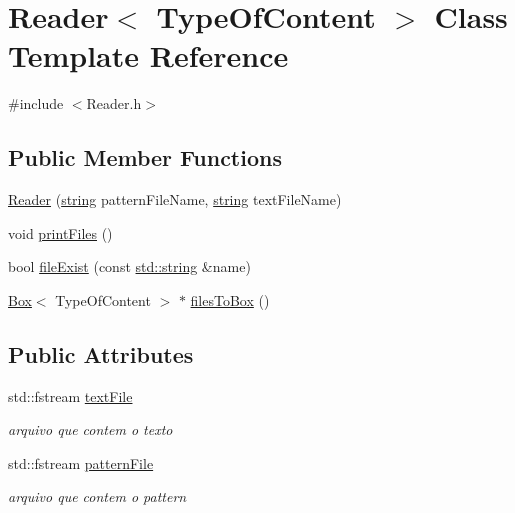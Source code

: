 \hypertarget{classReader}{\section{Reader$<$ Type\+Of\+Content $>$ Class Template Reference}
\label{classReader}
}


{\ttfamily \#include $<$Reader.\+h$>$}

\subsection*{Public Member Functions}
\begin{DoxyCompactItemize}
\item 
\hyperlink{classReader_a8b5850f38fe8b78b426575da9c421ba3}{Reader} (\hyperlink{Main_8cpp_a4505c08c065b48840a30eedd9845cce2}{string} pattern\+File\+Name, \hyperlink{Main_8cpp_a4505c08c065b48840a30eedd9845cce2}{string} text\+File\+Name)
\item 
void \hyperlink{classReader_a481551db3ffcea967de48b4725cb8bcb}{print\+Files} ()
\item 
bool \hyperlink{classReader_a7fbe4bed605ebdd00ec00309cff2ca9d}{file\+Exist} (const \hyperlink{Reader_8h_a4505c08c065b48840a30eedd9845cce2}{std\+::string} \&name)
\item 
\hyperlink{classBox}{Box}$<$ Type\+Of\+Content $>$ $\ast$ \hyperlink{classReader_a8ef7d743eeaf83f2c47e56164145afb0}{files\+To\+Box} ()
\end{DoxyCompactItemize}
\subsection*{Public Attributes}
\begin{DoxyCompactItemize}
\item 
std\+::fstream \hyperlink{classReader_ab1b8cba2b947b66777f32cbf7743ba7e}{text\+File}
\begin{DoxyCompactList}\small\item\em arquivo que contem o texto \end{DoxyCompactList}\item 
std\+::fstream \hyperlink{classReader_ab38c2e4b4e9e31982fd77158fb88eeec}{pattern\+File}
\begin{DoxyCompactList}\small\item\em arquivo que contem o pattern \end{DoxyCompactList}\end{DoxyCompactItemize}


